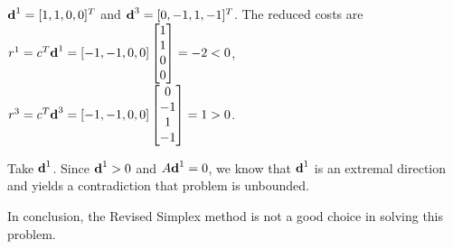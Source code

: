 \documentclass[12pt]{article}
\begin{document}
\begin{enumerate}
$\textbf d^1 = [1, 1, 0, 0]^T$ and $\textbf d^3 = [0, -1, 1, -1]^T$. The reduced costs are $r^1 = c^T\textbf d^1 = [-1, -1, 0, 0]\begin{bmatrix}
1\\1\\0\\0
\end{bmatrix} = -2 < 0$, $r^3 = c^T\textbf d^3 = [-1, -1, 0, 0]\begin{bmatrix}
0\\-1\\1\\-1 
\end{bmatrix} = 1 > 0$.

Take $\textbf d^1$. Since $\textbf d^1 >0$ and $A\textbf d^1 = 0$, we know that $\textbf d^1$ is an extremal direction and yields a contradiction that problem is unbounded.

In conclusion, the Revised Simplex method is not a good choice in solving this problem.


\end{enumerate}
\end{document}
